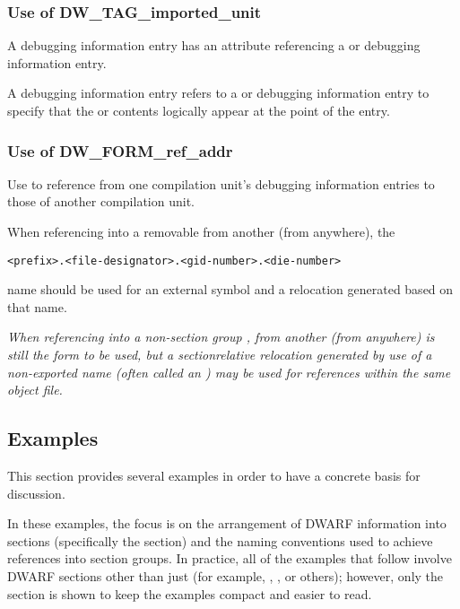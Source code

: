 \subsubsection{Use of DW\_TAG\_imported\_unit}

A \DWTAGimportedunit{} debugging information entry has an
\DWATimport{} attribute referencing a \DWTAGcompileunit{} or
\DWTAGpartialunit{} debugging information entry.

A \DWTAGimportedunit{} debugging information entry refers
to a 
\DWTAGcompileunit{} or 
\DWTAGpartialunit{} debugging
information entry to specify that the 
\DWTAGcompileunit{} or
\DWTAGpartialunit{} contents logically appear at the point
of the 
\DWTAGimportedunit{} entry.


\subsubsection{Use of DW\_FORM\_ref\_addr}

Use 
\DWFORMrefaddr{} to reference from one compilation
unit's debugging information entries to those of another
compilation unit.

When referencing into a removable 
\dotdebuginfo{}
from another \dotdebuginfo{} (from anywhere), the
\begin{alltt}
    <prefix>.<file-designator>.<gid-number>.<die-number>
\end{alltt}
name should be used for an external symbol and a relocation
generated based on that name.

\textit{When referencing into a 
non-section group 
\dotdebuginfo{},
from another \dotdebuginfo{} (from anywhere) 
\DWFORMrefaddr{} is
still the form to be used, but a section\dash relative relocation
generated by use of a non-exported name (often called an
) may be used for references within the
same object file.}

\subsection{Examples}
\label{app:examples}

This section provides several 
examples in order to have a
concrete basis for discussion.

In these examples, the focus is on the arrangement of DWARF
information into sections (specifically the 
\dotdebuginfo{}
section) and the naming conventions used to achieve references
into 
section groups. 
In practice, all of the examples that
follow involve DWARF sections other than just 
\dotdebuginfo{}
(for example, \dotdebugline{}, 
\dotdebugaranges{}, or others);
however, only the \dotdebuginfo{}
section is shown to keep the
examples compact and easier to read.

